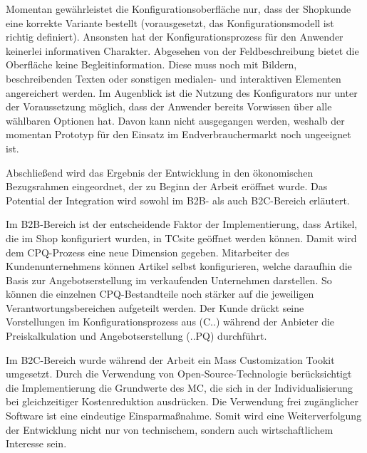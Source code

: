 \documentclass[11pt, a4paper, titlepage, listof=totoc, bibliography=totoc, index=totoc, twoside, openright, headings=normal]{scrreprt}
\begin{document}
Momentan gewährleistet die Konfigurationsoberfläche nur, dass der Shopkunde eine korrekte Variante bestellt (vorausgesetzt, das Konfigurationsmodell ist richtig definiert). Ansonsten hat der Konfigurationsprozess für den Anwender keinerlei informativen Charakter. Abgesehen von der Feldbeschreibung bietet die Oberfläche keine Begleitinformation. Diese muss noch mit Bildern, beschreibenden Texten oder sonstigen medialen- und interaktiven Elementen angereichert werden. Im Augenblick ist die Nutzung des Konfigurators nur unter der Voraussetzung möglich, dass der Anwender bereits Vorwissen über alle wählbaren Optionen hat. Davon kann nicht ausgegangen werden, weshalb der momentan Prototyp für den Einsatz im Endverbrauchermarkt noch ungeeignet ist.

Abschließend wird das Ergebnis der Entwicklung in den ökonomischen Bezugsrahmen eingeordnet, der zu Beginn der Arbeit eröffnet wurde. Das Potential der Integration wird sowohl im B2B- als auch B2C-Bereich erläutert.

Im B2B-Bereich ist der entscheidende Faktor der Implementierung, dass Artikel, die im Shop konfiguriert wurden, in TCsite geöffnet werden können. Damit wird dem CPQ-Prozess eine neue Dimension gegeben. Mitarbeiter des Kundenunternehmens können Artikel selbst konfigurieren, welche daraufhin die Basis zur Angebotserstellung im verkaufenden Unternehmen darstellen. So können die einzelnen CPQ-Bestandteile noch stärker auf die jeweiligen Verantwortungsbereichen aufgeteilt werden. Der Kunde drückt seine Vorstellungen im Konfigurationsprozess aus (C..) während der Anbieter die Preiskalkulation und Angebotserstellung (..PQ) durchführt.

Im B2C-Bereich wurde während der Arbeit ein Mass Customization Tookit umgesetzt. Durch die Verwendung von Open-Source-Technologie berücksichtigt die Implementierung die Grundwerte des \ac{MC}, die sich in der Individualisierung bei gleichzeitiger Kostenreduktion ausdrücken. Die Verwendung frei zugänglicher Software ist eine eindeutige Einsparmaßnahme. Somit wird eine Weiterverfolgung der Entwicklung nicht nur von technischem, sondern auch wirtschaftlichem Interesse sein.

\pagebreak






\end{document}
